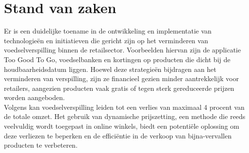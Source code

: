 \section{Stand van zaken}%
\label{sec:state-of-the-art}
Er is een duidelijke toename in de ontwikkeling en implementatie van technologieën en initiatieven die gericht zijn op het verminderen van voedselverspilling binnen de retailsector.
Voorbeelden hiervan zijn de applicatie Too Good To Go, voedselbanken en kortingen op producten die dicht bij de houdbaarheidsdatum liggen.
Hoewel deze strategieën bijdragen aan het verminderen van verspilling, zijn ze financieel gezien minder aantrekkelijk voor retailers,
aangezien producten vaak gratis of tegen sterk gereduceerde prijzen worden aangeboden.
\\
Volgens\textcite{sarma2023} kan voedselverspilling leiden tot een verlies van maximaal 4 procent van de totale omzet.
Het gebruik van dynamische prijszetting, een methode die reeds veelvuldig wordt toegepast in online winkels,
biedt een potentiële oplossing om deze verliezen te beperken en de efficiëntie in de verkoop van bijna-vervallen producten te verbeteren.


